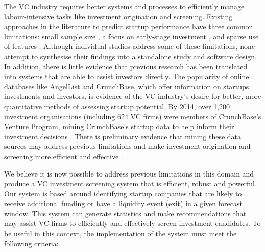 \documentclass[../thesis/thesis.tex]{subfiles}
\begin{document}
The VC industry requires better systems and processes to efficiently manage labour-intensive tasks like investment origination and screening. Existing approaches in the literature to predict startup performance have three common limitations: small sample size \cite{ahlers2015, gimmon2010, dixon2014, hoenen2014, yu2015, an2015, werth2013, croce2016}, a focus on early-stage investment \cite{beckwith2016, ahlers2015, cheng2016, yuan2016, croce2016}, and sparse use of features \cite{ahlers2015, an2015, cheng2016, croce2016, werth2013, gimmon2010}. Although individual studies address some of these limitations, none attempt to synthesise their findings into a standalone study and software design. In addition, there is little evidence that previous research has been translated into systems that are able to assist investors directly. The popularity of online databases like AngelList and CrunchBase, which offer information on startups, investments and investors, is evidence of the VC industry’s desire for better, more quantitative methods of assessing startup potential. By 2014, over 1,200 investment organisations (including 624 VC firms) were members of CrunchBase's Venture Program, mining CrunchBase's startup data to help inform their investment decisions \cite{patil2015}. There is preliminary evidence that mining these data sources may address previous limitations and make investment origination and screening more efficient and effective \cite{stone2014,bhat2011}.

We believe it is now possible to address previous limitations in this domain and produce a VC investment screening system that is efficient, robust and powerful. Our system is based around identifying startup companies that are likely to receive additional funding or have a liquidity event (exit) in a given forecast window. This system can generate statistics and make recommendations that may assist VC firms to efficiently and effectively screen investment candidates. To be useful in this context, the implementation of the system must meet the following criteria:
\end{document}
